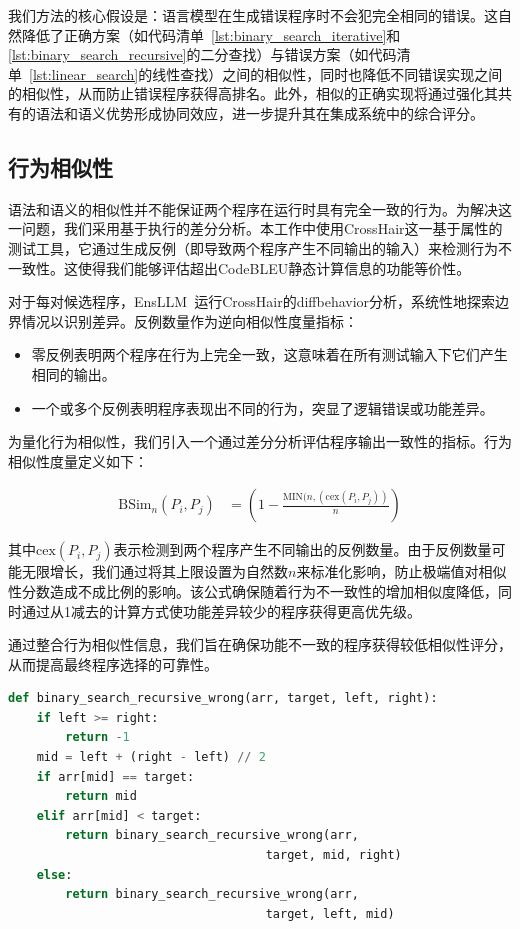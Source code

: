 \documentclass{article}
\newcommand{\tool}{EnsLLM}
\begin{document}
\begin{CJK*}{UTF8}{gbsn}
我们方法的核心假设是：语言模型在生成错误程序时不会犯完全相同的错误。这自然降低了正确方案（如代码清单~\ref{lst:binary_search_iterative}和\ref{lst:binary_search_recursive}的二分查找）与错误方案（如代码清单~\ref{lst:linear_search}的线性查找）之间的相似性，同时也降低不同错误实现之间的相似性，从而防止错误程序获得高排名。此外，相似的正确实现将通过强化其共有的语法和语义优势形成协同效应，进一步提升其在集成系统中的综合评分。
\subsection{行为相似性}
语法和语义的相似性并不能保证两个程序在运行时具有完全一致的行为。为解决这一问题，我们采用基于执行的差分分析。本工作中使用CrossHair这一基于属性的测试工具，它通过生成反例（即导致两个程序产生不同输出的输入）来检测行为不一致性。这使得我们能够评估超出CodeBLEU静态计算信息的功能等价性。

对于每对候选程序，\tool\ 运行CrossHair的diffbehavior分析，系统性地探索边界情况以识别差异。反例数量作为逆向相似性度量指标：

\begin{itemize}
    \item 零反例表明两个程序在行为上完全一致，这意味着在所有测试输入下它们产生相同的输出。
    \item 一个或多个反例表明程序表现出不同的行为，突显了逻辑错误或功能差异。
\end{itemize}

为量化行为相似性，我们引入一个通过差分分析评估程序输出一致性的指标。行为相似性度量定义如下：

\begin{equation}
\label{eq:beh_similarity}
\begin{split}
    \text{BSim}_n(P_i, P_j) &=  \left(1 - \frac{\text{MIN}(n, ({\text{cex}}(P_i, P_j))}{n} \right)
\end{split}
\end{equation}

\noindent 其中\( \text{cex}(P_i, P_j) \)表示检测到两个程序产生不同输出的反例数量。由于反例数量可能无限增长，我们通过将其上限设置为自然数\( n \)来标准化影响，防止极端值对相似性分数造成不成比例的影响。该公式确保随着行为不一致性的增加相似度降低，同时通过从1减去的计算方式使功能差异较少的程序获得更高优先级。

通过整合行为相似性信息，我们旨在确保功能不一致的程序获得较低相似性评分，从而提高最终程序选择的可靠性。

\begin{lstlisting}[language=Python, caption={Incorrect Recursive Binary Search Implementation}, label={lst:binary_search_recursive_wrong}]
def binary_search_recursive_wrong(arr, target, left, right):
    if left >= right:
        return -1
    mid = left + (right - left) // 2
    if arr[mid] == target:
        return mid
    elif arr[mid] < target:
        return binary_search_recursive_wrong(arr,
                                    target, mid, right)
    else:
        return binary_search_recursive_wrong(arr,
                                    target, left, mid)
\end{lstlisting}


\end{CJK*}
\end{document}
